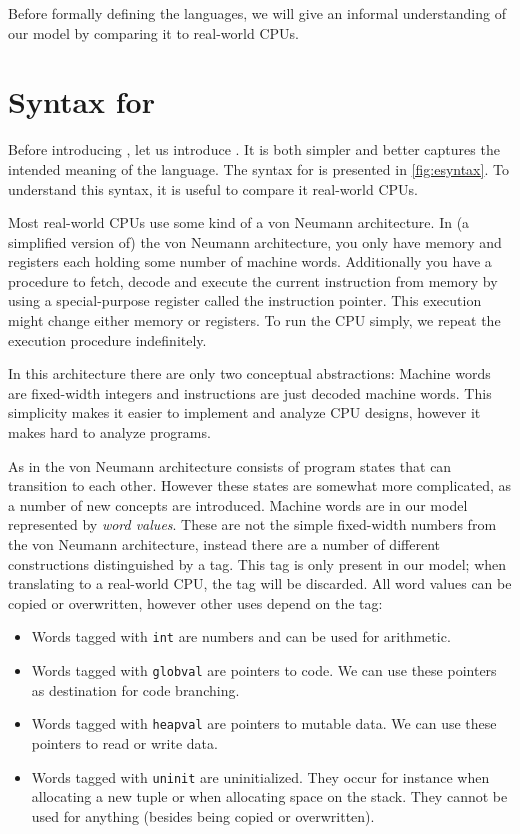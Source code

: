 Before formally defining the languages, we will give an informal understanding
of our model by comparing it to real-world CPUs.

\section{Syntax for \ATALe}

Before introducing \ATAL, let us introduce \ATALe. It is both simpler and better
captures the intended meaning of the language. The syntax for \ATALe is
presented in \cref{fig:esyntax}. To understand this syntax, it is useful to
compare it real-world CPUs.

Most real-world CPUs use some kind of a von Neumann architecture. In (a
simplified version of) the von Neumann architecture, you only have memory and
registers each holding some number of machine words. Additionally you have a
procedure to fetch, decode and execute the current instruction from memory by
using a special-purpose register called the instruction pointer. This execution
might change either memory or registers. To run the CPU simply, we repeat the
execution procedure indefinitely.

In this architecture there are only two conceptual abstractions: Machine words
are fixed-width integers and instructions are just decoded machine words. This
simplicity makes it easier to implement and analyze CPU designs, however it
makes hard to analyze programs.

As in the von Neumann architecture \ATALe consists of program states that can
transition to each other. However these states are somewhat more complicated, as
a number of new concepts are introduced. Machine words are in our model
represented by \emph{word values}. These are not the simple fixed-width numbers
from the von Neumann architecture, instead there are a number of different
constructions distinguished by a tag. This tag is only present in our model;
when translating to a real-world CPU, the tag will be discarded. All word values
can be copied or overwritten, however other uses depend on the tag:

\begin{itemize}
\item Words tagged with \texttt{int} are numbers and can be used for
  arithmetic.
\item Words tagged with \texttt{globval} are pointers to code. We can use these
  pointers as destination for code branching.
\item Words tagged with \texttt{heapval} are pointers to mutable data. We can
  use these pointers to read or write data.
\item Words tagged with \texttt{uninit} are uninitialized. They occur for
  instance when allocating a new tuple or when allocating space on the
  stack. They cannot be used for anything (besides being copied or overwritten).
\end{itemize}

